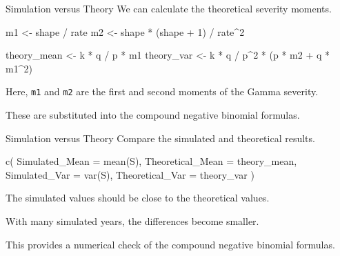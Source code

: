 \documentclass[
  ignorenonframetext,
  aspectratio=169,
]{beamer}
\newenvironment{Shaded}{\begin{snugshade}}{\end{snugshade}}
\newcommand{\AttributeTok}[1]{\textcolor[rgb]{0.40,0.45,0.13}{#1}}
\newcommand{\DecValTok}[1]{\textcolor[rgb]{0.68,0.00,0.00}{#1}}
\newcommand{\FunctionTok}[1]{\textcolor[rgb]{0.28,0.35,0.67}{#1}}
\newcommand{\NormalTok}[1]{\textcolor[rgb]{0.00,0.23,0.31}{#1}}
\newcommand{\OtherTok}[1]{\textcolor[rgb]{0.00,0.23,0.31}{#1}}
\newcommand{\SpecialCharTok}[1]{\textcolor[rgb]{0.37,0.37,0.37}{#1}}
\begin{document}
\begin{frame}[fragile]{Simulation versus Theory}
\protect{}\label{simulation-versus-theory}
We can calculate the theoretical severity moments.

\begin{Shaded}
\begin{Highlighting}[]
\NormalTok{m1 }\OtherTok{\textless{}{-}}\NormalTok{ shape }\SpecialCharTok{/}\NormalTok{ rate}
\NormalTok{m2 }\OtherTok{\textless{}{-}}\NormalTok{ shape }\SpecialCharTok{*}\NormalTok{ (shape }\SpecialCharTok{+} \DecValTok{1}\NormalTok{) }\SpecialCharTok{/}\NormalTok{ rate}\SpecialCharTok{\^{}}\DecValTok{2}

\NormalTok{theory\_mean }\OtherTok{\textless{}{-}}\NormalTok{ k }\SpecialCharTok{*}\NormalTok{ q }\SpecialCharTok{/}\NormalTok{ p }\SpecialCharTok{*}\NormalTok{ m1}
\NormalTok{theory\_var }\OtherTok{\textless{}{-}}\NormalTok{ k }\SpecialCharTok{*}\NormalTok{ q }\SpecialCharTok{/}\NormalTok{ p}\SpecialCharTok{\^{}}\DecValTok{2} \SpecialCharTok{*}
\NormalTok{  (p }\SpecialCharTok{*}\NormalTok{ m2 }\SpecialCharTok{+}\NormalTok{ q }\SpecialCharTok{*}\NormalTok{ m1}\SpecialCharTok{\^{}}\DecValTok{2}\NormalTok{)}
\end{Highlighting}
\end{Shaded}

Here, \texttt{m1} and \texttt{m2} are the first and second moments of
the Gamma severity.

These are substituted into the compound negative binomial formulas.
\end{frame}

\begin{frame}[fragile]{Simulation versus Theory}
\protect{}\label{simulation-versus-theory-1}
Compare the simulated and theoretical results.

\begin{Shaded}
\begin{Highlighting}[]
\FunctionTok{c}\NormalTok{(}
  \AttributeTok{Simulated\_Mean =} \FunctionTok{mean}\NormalTok{(S),}
  \AttributeTok{Theoretical\_Mean =}\NormalTok{ theory\_mean,}
  \AttributeTok{Simulated\_Var =} \FunctionTok{var}\NormalTok{(S),}
  \AttributeTok{Theoretical\_Var =}\NormalTok{ theory\_var}
\NormalTok{)}
\end{Highlighting}
\end{Shaded}

The simulated values should be close to the theoretical values.

With many simulated years, the differences become smaller.

This provides a numerical check of the compound negative binomial
formulas.
\end{frame}
\end{document}
